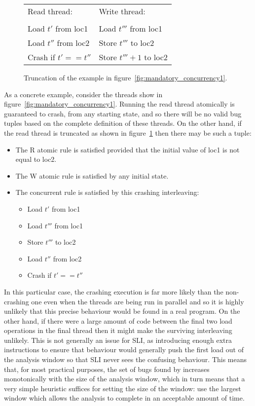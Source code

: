 \begin{figure}
\begin{tabular}{ll}
Read thread:          & Write thread: \\
\\
Load $t'$ from loc1   & Load $t'''$ from loc1 \\
Load $t''$ from loc2  & Store $t'''$ to loc2 \\
Crash if $t' == t''$  & Store $t''' + 1$ to loc2
\end{tabular}
\label{fig:mandatory_concurrency2}
\caption{Truncation of the example in figure~\ref{fig:mandatory_concurrency1}.}
\end{figure}

As a concrete example, consider the threads show in
figure~\ref{fig:mandatory_concurrency1}.  Running the read thread
atomically is guaranteed to crash, from any starting state, and so
there will be no valid bug tuples based on the complete definition of
these threads.  On the other hand, if the read thread is truncated as
shown in figure~\ref{fig:mandatory_concurrency2} then there may be
such a tuple:

\begin{itemize}
\item The R atomic rule is satisfied provided that the initial value of loc1 is not equal to loc2.
\item The W atomic rule is satisfied by any initial state.
\item The concurrent rule is satisfied by this crashing interleaving:
  \begin{itemize}
  \item Load $t'$ from loc1
  \item Load $t'''$ from loc1
  \item Store $t'''$ to loc2
  \item Load $t''$ from loc2
  \item Crash if $t' == t''$
  \end{itemize}
\end{itemize}

In this particular case, the crashing execution is far more likely
than the non-crashing one even when the threads are being run in
parallel and so it is highly unlikely that this precise behaviour
would be found in a real program.  On the other hand, if there were a
large amount of code between the final two load operations in the
final thread then it might make the surviving interleaving unlikely.
This is not generally an issue for SLI, as introducing enough extra
instructions to ensure that behaviour would generally push the first
load out of the analysis window so that SLI never sees the confusing
behaviour.  This means that, for most practical purposes, the set of
bugs found by increases monotonically with the size of the analysis
window, which in turn means that a very simple heuristic suffices for
setting the size of the window: use the largest window which allows
the analysis to complete in an acceptable amount of time.

